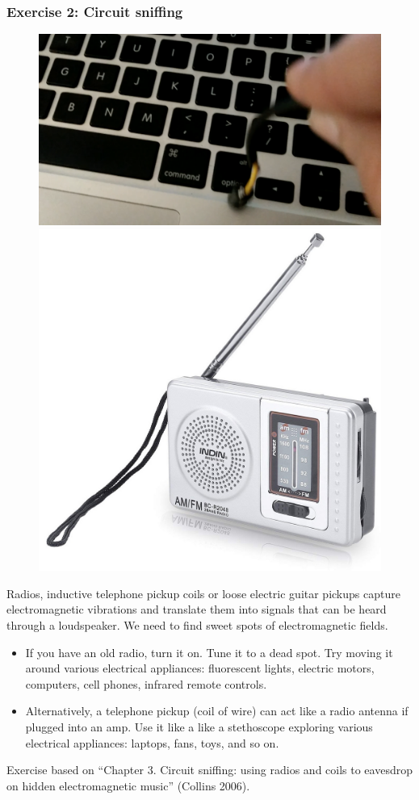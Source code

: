 \documentclass[screen, aspectratio=169]{beamer}
\begin{document}
\begin{frame}
  \frametitle{Exercise 2: Circuit sniffing}
   \begin{figure}
	\includegraphics[scale=0.08]{img/pickup.png}
	\includegraphics[scale=0.08]{img/battery-powered-radio.jpg}	
\end{figure}
{\scriptsize 
Radios, inductive telephone pickup coils or loose electric guitar pickups capture electromagnetic vibrations and translate them into signals that can be heard through a loudspeaker. We need to find sweet spots of electromagnetic fields.
    \begin{itemize}
	\item If you have an old radio, turn it on. Tune it to a dead spot. Try moving it around various electrical appliances: fluorescent lights, electric motors, computers, cell phones, infrared remote controls. 
	\item Alternatively, a telephone pickup (coil of wire) can act like a radio antenna if plugged into an amp. Use it like a like a stethoscope exploring various electrical appliances: laptops, fans, toys, and so on.
    \end{itemize}   
}    
{\tiny
Exercise based on ``Chapter 3. Circuit sniffing: using radios and coils to eavesdrop on hidden electromagnetic music'' (Collins 2006).
}
\end{frame}
\end{document}
